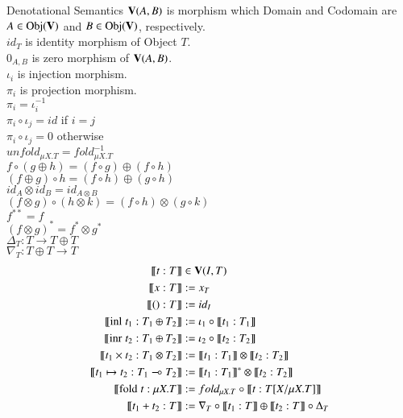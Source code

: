\documentclass[10pt]{jsarticle}
\newcommand{\semantics}[1]{{\llbracket #1 \rrbracket}}
\begin{document}
\begin{itembox}[c]{Denotational Semantics}
${\bf V}(A,B)$ is morphism which Domain and Codomain are $A \in \text{Obj}({\bf V})$ and $B \in \text{Obj}({\bf V})$, respectively. \\
$id_T$ is identity morphism of Object $T$. \\
$0_{A,B}$ is zero morphism of ${\bf V}(A,B)$. \\
$\iota_i$ is injection morphism. \\
$\pi_i$ is projection morphism. \\
$\pi_i = \iota_i^{-1}$ \\
$\pi_i\circ\iota_j = id$ if $i = j$ \\
$\pi_i\circ\iota_j = 0$ otherwise \\
$unfold_{\mu{X}.T} = fold^{-1}_{\mu{X}.T}$ \\
$f \circ (g \oplus h) = (f \circ g) \oplus (f \circ h)$ \\
$(f \oplus g) \circ h = (f \circ h) \oplus (g \circ h)$ \\
$id_A \otimes id_B = id_{A \otimes B}$ \\
$(f \otimes g) \circ (h \otimes k) = (f \circ h) \otimes (g \circ k)$ \\
$f^{\ast\ast} = f$ \\
${(f \otimes g)}^\ast = f^\ast \otimes g^\ast$ \\
$\Delta_T : T \rightarrow T\oplus{}T$ \\
$\nabla_T : T\oplus{}T \rightarrow T$
  \begin{align*}
    \semantics{t:T}                               &\in {\bf V}(I,T) \\
    \semantics{x:T}                               &:= x_T \\
    \semantics{\text{()}:T}                       &:= id_I \\
    \semantics{\text{inl}\;t_1:T_1\oplus{}T_2}    &:= \iota_1\circ\semantics{t_1:T_1} \\
    \semantics{\text{inr}\;t_2:T_1\oplus{}T_2}    &:= \iota_2\circ\semantics{t_2:T_2} \\
    \semantics{t_1\times{}t_2:T_1\otimes{}T_2}    &:= \semantics{t_1:T_1}\otimes\semantics{t_2:T_2} \\
    \semantics{t_1\mapsto{}t_2:T_1\multimap{}T_2} &:= \semantics{t_1:T_1}^\ast\otimes\semantics{t_2:T_2} \\
    \semantics{\text{fold}\;t:\mu{X}.T}           &:= fold_{\mu{X}.T}\circ\semantics{t:T[X/\mu{X}.T]} \\
    \semantics{t_1+t_2:T}                         &:= \nabla_T\circ\semantics{t_1:T}\oplus\semantics{t_2:T}\circ\Delta_T \\
  \end{align*}
\end{itembox}
\end{document}
